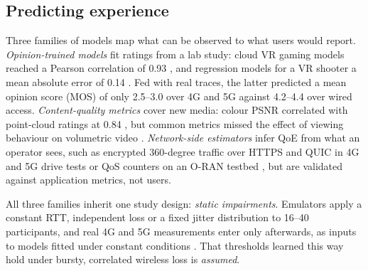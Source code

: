 \subsection{Predicting experience}
Three families of models map what can be observed to what users would report.
\emph{Opinion-trained models} fit ratings from a lab study: cloud VR gaming models reached a Pearson
correlation of 0.93 \cite{W4400981668}, and regression models for a VR shooter a mean absolute error of 0.14 \cite{W4405935991}. Fed with real traces, the latter predicted a mean opinion
score (MOS) of only 2.5--3.0 over 4G and 5G against 4.2--4.4 over wired access. \emph{Content-quality
metrics} cover new media: colour PSNR correlated with point-cloud ratings at 0.84 \cite{W4387831705}, but
common metrics missed the effect of viewing behaviour on volumetric video \cite{W4386172458}.
\emph{Network-side estimators} infer QoE from what an operator sees, such as encrypted 360-degree traffic
over HTTPS and QUIC in 4G and 5G drive tests \cite{W4384158049} or QoS counters on an O-RAN testbed
\cite{W4389923869}, but are validated against application metrics, not users.

All three families inherit one study design: \emph{static impairments}. Emulators apply a constant RTT,
independent loss or a fixed jitter distribution to 16--40 participants, and real 4G and 5G measurements
enter only afterwards, as inputs to models fitted under constant conditions
\cite{W4405935991,W4415822410}. That thresholds learned this way hold under bursty, correlated wireless loss is \emph{assumed}.
